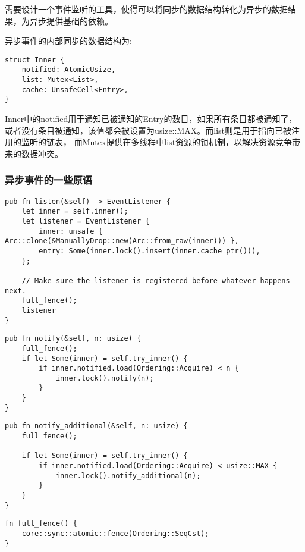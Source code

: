 需要设计一个事件监听的工具，使得可以将同步的数据结构转化为异步的数据结果，为异步提供基础的依赖。

异步事件的内部同步的数据结构为:

\begin{lstlisting}[caption=异步事件底层的同步结构]
struct Inner {
    notified: AtomicUsize,
    list: Mutex<List>,
    cache: UnsafeCell<Entry>,
}
\end{lstlisting}

Inner中的notified用于通知已被通知的Entry的数目，如果所有条目都被通知了，或者没有条目被通知，该值都会被设置为usize::MAX。而list则是用于指向已被注册的监听的链表， 而Mutex提供在多线程中list资源的锁机制，以解决资源竞争带来的数据冲突。

\subsubsection{异步事件的一些原语}
\label{sssec:event}

\begin{lstlisting}[caption = 监听者的注册]
pub fn listen(&self) -> EventListener {
    let inner = self.inner();
    let listener = EventListener {
        inner: unsafe { Arc::clone(&ManuallyDrop::new(Arc::from_raw(inner))) },
        entry: Some(inner.lock().insert(inner.cache_ptr())),
    };

    // Make sure the listener is registered before whatever happens next.
    full_fence();
    listener
}
\end{lstlisting}

\begin{lstlisting}[caption = 通知一定数量的监听者]
pub fn notify(&self, n: usize) {
    full_fence();
    if let Some(inner) = self.try_inner() {
        if inner.notified.load(Ordering::Acquire) < n {
            inner.lock().notify(n);
        }
    }
}
\end{lstlisting}

\begin{lstlisting}[caption = 通知一定数量没有被通知的监听者]
pub fn notify_additional(&self, n: usize) {
    full_fence();

    if let Some(inner) = self.try_inner() {
        if inner.notified.load(Ordering::Acquire) < usize::MAX {
            inner.lock().notify_additional(n);
        }
    }
}
\end{lstlisting}

\begin{lstlisting}[caption=full\_fence]
fn full_fence() {
    core::sync::atomic::fence(Ordering::SeqCst);
}
\end{lstlisting}

